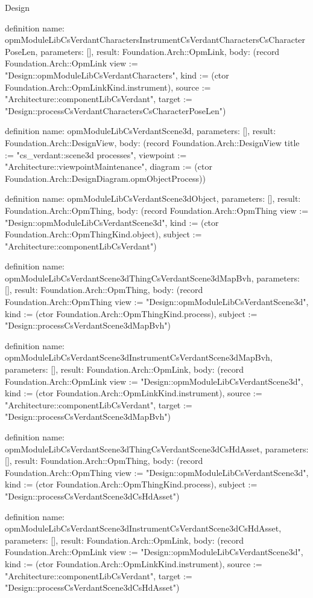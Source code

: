 \begin{lexlean}{Design}
\begin{semanticmodule}
definition{
  name: opmModuleLibCsVerdantCharactersInstrumentCsVerdantCharactersCsCharacterPoseLen,
  parameters: [],
  result: Foundation.Arch::OpmLink,
  body: (record Foundation.Arch::OpmLink {view := "Design::opmModuleLibCsVerdantCharacters", kind := (ctor Foundation.Arch::OpmLinkKind.instrument), source := "Architecture::componentLibCsVerdant", target := "Design::processCsVerdantCharactersCsCharacterPoseLen"})
}

definition{
  name: opmModuleLibCsVerdantScene3d,
  parameters: [],
  result: Foundation.Arch::DesignView,
  body: (record Foundation.Arch::DesignView {title := "cs_verdant::scene3d processes", viewpoint := "Architecture::viewpointMaintenance", diagram := (ctor Foundation.Arch::DesignDiagram.opmObjectProcess)})
}

definition{
  name: opmModuleLibCsVerdantScene3dObject,
  parameters: [],
  result: Foundation.Arch::OpmThing,
  body: (record Foundation.Arch::OpmThing {view := "Design::opmModuleLibCsVerdantScene3d", kind := (ctor Foundation.Arch::OpmThingKind.object), subject := "Architecture::componentLibCsVerdant"})
}

definition{
  name: opmModuleLibCsVerdantScene3dThingCsVerdantScene3dMapBvh,
  parameters: [],
  result: Foundation.Arch::OpmThing,
  body: (record Foundation.Arch::OpmThing {view := "Design::opmModuleLibCsVerdantScene3d", kind := (ctor Foundation.Arch::OpmThingKind.process), subject := "Design::processCsVerdantScene3dMapBvh"})
}

definition{
  name: opmModuleLibCsVerdantScene3dInstrumentCsVerdantScene3dMapBvh,
  parameters: [],
  result: Foundation.Arch::OpmLink,
  body: (record Foundation.Arch::OpmLink {view := "Design::opmModuleLibCsVerdantScene3d", kind := (ctor Foundation.Arch::OpmLinkKind.instrument), source := "Architecture::componentLibCsVerdant", target := "Design::processCsVerdantScene3dMapBvh"})
}

definition{
  name: opmModuleLibCsVerdantScene3dThingCsVerdantScene3dCsHdAsset,
  parameters: [],
  result: Foundation.Arch::OpmThing,
  body: (record Foundation.Arch::OpmThing {view := "Design::opmModuleLibCsVerdantScene3d", kind := (ctor Foundation.Arch::OpmThingKind.process), subject := "Design::processCsVerdantScene3dCsHdAsset"})
}

definition{
  name: opmModuleLibCsVerdantScene3dInstrumentCsVerdantScene3dCsHdAsset,
  parameters: [],
  result: Foundation.Arch::OpmLink,
  body: (record Foundation.Arch::OpmLink {view := "Design::opmModuleLibCsVerdantScene3d", kind := (ctor Foundation.Arch::OpmLinkKind.instrument), source := "Architecture::componentLibCsVerdant", target := "Design::processCsVerdantScene3dCsHdAsset"})
}


\end{semanticmodule}
\end{lexlean}
